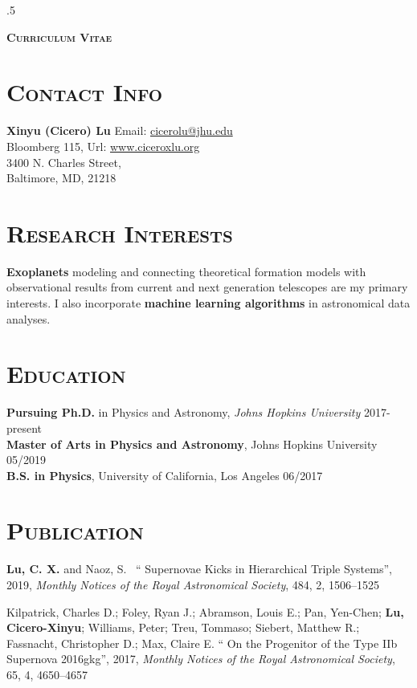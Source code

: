 \documentclass[line, margin]{res}
\begin{document}
 \moveleft.5\hoffset\centerline{\LARGE\bf \textsc {Curriculum Vitae}}
 
\begin{resume}
\section{\textsc{Contact Info}}
\textbf{\Large{Xinyu (Cicero) Lu}} \hfill Email: \href{mailto:cicerolu@jhu.edu}{cicerolu@jhu.edu}\\
	 Bloomberg 115, \hfill Url: \href{www.ciceroxlu.org}{www.ciceroxlu.org} \\
	 3400 N. Charles Street, \\
	 Baltimore, MD, 21218 
	 
\section{\textsc{Research Interests}}
\textbf{Exoplanets} modeling and connecting theoretical formation models with observational results from current and next generation telescopes are my primary interests. I also incorporate \textbf{machine learning algorithms} in astronomical data analyses. 

\section{\textsc{Education}} 
\textbf{Pursuing Ph.D.} in Physics and Astronomy, \emph{Johns Hopkins University} \hfill 2017-present\\
\textbf{Master of Arts in Physics and Astronomy}, Johns Hopkins University \hfill  05/2019\\
\textbf{B.S. in Physics}, University of California, Los Angeles \hfill  06/2017\\


\section{\textsc{Publication}}

\textbf{Lu, C. X.} and Naoz, S. ~\enquote{ Supernovae Kicks in Hierarchical Triple Systems}, 2019, \textsl{Monthly Notices of the Royal Astronomical Society},  484, 2, 1506--1525

Kilpatrick, Charles D.; Foley, Ryan J.; Abramson, Louis E.; Pan, Yen-Chen; \textbf{Lu, Cicero-Xinyu}; Williams, Peter; Treu, Tommaso; Siebert, Matthew R.; Fassnacht, Christopher D.; Max, Claire E.  \enquote{ On the Progenitor of the Type IIb Supernova 2016gkg}, 2017, \textsl{Monthly Notices of the Royal Astronomical Society}, 65, 4, 4650--4657


\end{resume}
\end{document}
